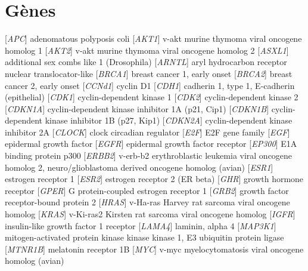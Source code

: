 	\section{\textcolor{white!15!black}{Gènes}}\label{app:ac:gènes}
		\begin{acronym}[CDKN2A]
					[\emph{APC}]	{adenomatous polyposis coli}
					[\emph{AKT1}]	{v-akt murine thymoma viral oncogene homolog 1}
					[\emph{AKT2}]	{v-akt murine thymoma viral oncogene homolog 2}
					[\emph{ASXL1}]	{additional sex combs like 1 (Drosophila)}
					[\emph{ARNTL}]	{aryl hydrocarbon receptor nuclear translocator-like}
					[\emph{BRCA1}]	{breast cancer 1, early onset}
					[\emph{BRCA2}]	{breast cancer 2, early onset}
					[\emph{CCNd1}]	{cyclin D1}
					[\emph{CDH1}]	{cadherin 1, type 1, E-cadherin (epithelial)}
					[\emph{CDK1}]	{cyclin-dependent kinase 1}
					[\emph{CDK2}]	{cyclin-dependent kinase 2}
				[\emph{CDKN1A}]	{cyclin-dependent kinase inhibitor 1A (p21, Cip1)}
				[\emph{CDKN1B}]	{cyclin-dependent kinase inhibitor 1B (p27, Kip1)}
				[\emph{CDKN2A}]	{cyclin-dependent kinase inhibitor 2A}
					[\emph{CLOCK}]	{clock circadian regulator}
					[\emph{E2F}]	{E2F gene family}
					[\emph{EGF}]	{epidermal growth factor}
					[\emph{EGFR}]	{epidermal growth factor receptor}
					[\emph{EP300}]	{E1A binding protein p300}
					[\emph{ERBB2}]	{v-erb-b2 erythroblastic leukemia viral oncogene homolog 2, neuro/glioblastoma derived oncogene homolog (avian)}
					[\emph{ESR1}]	{estrogen receptor 1}
					[\emph{ESR2}]	{estrogen receptor 2 (ER beta)}
					[\emph{GHR}]	{growth hormone receptor}
					[\emph{GPER}]	{G protein-coupled estrogen receptor 1}
					[\emph{GRB2}]	{growth factor receptor-bound protein 2}
					[\emph{HRAS}]	{v-Ha-ras Harvey rat sarcoma viral oncogene homolog}
					[\emph{KRAS}]	{v-Ki-ras2 Kirsten rat sarcoma viral oncogene homolog}
					[\emph{IGFR}]	{insulin-like growth factor 1 receptor}
					[\emph{LAMA4}]	{laminin, alpha 4}
				[\emph{MAP3K1}]	{mitogen-activated protein kinase kinase kinase 1, E3 ubiquitin protein ligase}
				[\emph{MTNR1B}]	{melatonin receptor 1B}
					[\emph{MYC}]	{v-myc myelocytomatosis viral oncogene homolog (avian)}

\end{acronym}
